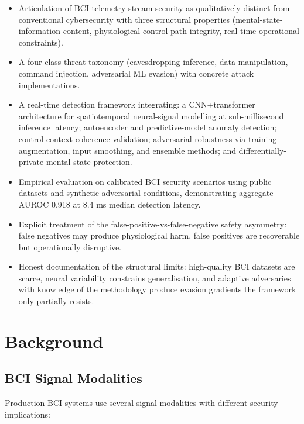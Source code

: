 \documentclass[sigconf,nonacm]{acmart}
\begin{document}
\begin{itemize}
  \item Articulation of BCI telemetry-stream security as
        qualitatively distinct from conventional cybersecurity
        with three structural properties (mental-state-information
        content, physiological control-path integrity,
        real-time operational constraints).
  \item A four-class threat taxonomy (eavesdropping inference, data
        manipulation, command injection, adversarial ML evasion)
        with concrete attack implementations.
  \item A real-time detection framework integrating: a CNN+transformer
        architecture for spatiotemporal neural-signal modelling at
        sub-millisecond inference latency; autoencoder and
        predictive-model anomaly detection; control-context
        coherence validation; adversarial robustness via training
        augmentation, input smoothing, and ensemble methods; and
        differentially-private mental-state protection.
  \item Empirical evaluation on calibrated BCI security
        scenarios using public datasets and synthetic
        adversarial conditions, demonstrating aggregate AUROC
        0.918 at 8.4 ms median detection latency.
  \item Explicit treatment of the false-positive-vs-false-negative
        safety asymmetry: false negatives may produce
        physiological harm, false positives are
        recoverable but operationally disruptive.
  \item Honest documentation of the structural limits: high-quality
        BCI datasets are scarce, neural variability constrains
        generalisation, and adaptive adversaries with knowledge of
        the methodology produce evasion gradients the framework
        only partially resists.
\end{itemize}

\section{Background}

\subsection{BCI Signal Modalities}

Production BCI systems use several signal modalities with
different security implications:
\end{document}
